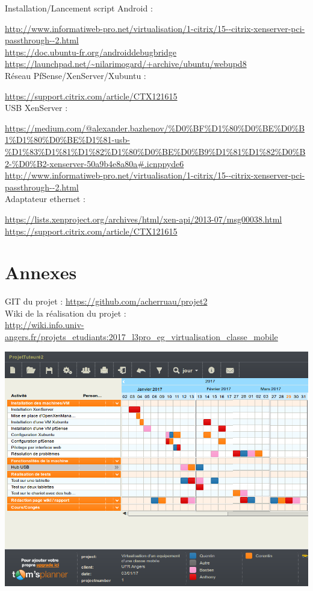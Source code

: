 \documentclass[a4paper,12pt]{extarticle}
\begin{document}
Installation/Lancement script Android :

\url{http://www.informatiweb-pro.net/virtualisation/1-citrix/15--citrix-xenserver-pci-passthrough--2.html}\\
\url{https://doc.ubuntu-fr.org/androiddebugbridge}\\
\url{https://launchpad.net/~nilarimogard/+archive/ubuntu/webupd8}\\

Réseau PfSense/XenServer/Xubuntu :

\url{https://support.citrix.com/article/CTX121615}\\

USB XenServer :

\url{https://medium.com/@alexander.bazhenov/\%D0\%BF\%D1\%80\%D0\%BE\%D0\%B1\%D1\%80\%D0\%BE\%D1\%81-usb-\%D1\%83\%D1\%81\%D1\%82\%D1\%80\%D0\%BE\%D0\%B9\%D1\%81\%D1\%82\%D0\%B2-\%D0\%B2-xenserver-50a9b4e8a80a#.icnppyde6}\\
\url{http://www.informatiweb-pro.net/virtualisation/1-citrix/15--citrix-xenserver-pci-passthrough--2.html}\\

Adaptateur ethernet :

\url{https://lists.xenproject.org/archives/html/xen-api/2013-07/msg00038.html}\\
\url{https://support.citrix.com/article/CTX121615}\\

\clearpage

\section{Annexes}

GIT du projet :
\url{https://github.com/acherruau/projet2}\\

Wiki de la réalisation du projet :\\ 
\url{http://wiki.info.univ-angers.fr/projets_etudiants:2017_l3pro_eg_virtualisation_classe_mobile}\\

\begin{center}
\includegraphics[scale=0.6, angle=270]{Gantt4}
\end{center}
\end{document}
